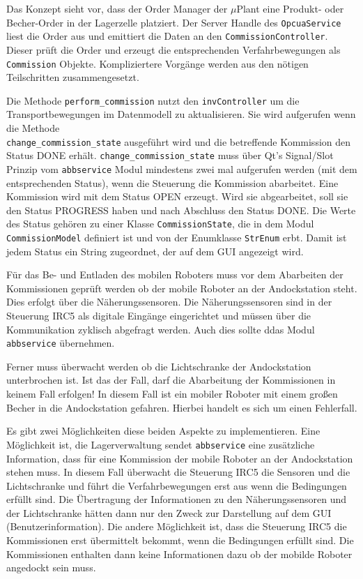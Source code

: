 Das Konzept sieht vor, dass der Order Manager der $\mu$Plant eine Produkt- oder Becher-Order in der Lagerzelle platziert.
Der Server Handle des \verb|OpcuaService| liest die Order aus und emittiert die Daten an den \verb|CommissionController|. 
Dieser prüft die Order und erzeugt die entsprechenden Verfahrbewegungen als \verb|Commission| Objekte. 
Kompliziertere Vorgänge werden aus den nötigen Teilschritten zusammengesetzt. 

Die Methode \verb|perform_commission| nutzt den \verb|invController| um die Transportbewegungen im Datenmodell zu aktualisieren.
Sie wird aufgerufen wenn die Methode \\ \verb|change_commission_state| ausgeführt wird und die betreffende Kommission den Status DONE erhält.
\verb|change_commission_state| muss über Qt's Signal/Slot Prinzip vom \verb|abbservice| Modul mindestens zwei mal aufgerufen werden (mit dem entsprechenden Status), wenn die Steuerung die Kommission abarbeitet.
Eine Kommission wird mit dem Status OPEN erzeugt. Wird sie abgearbeitet, soll sie den Status PROGRESS haben und nach Abschluss den Status DONE.
Die Werte des Status gehören zu einer Klasse \verb|CommissionState|, die in dem Modul \verb|CommissionModel| definiert ist und von der Enumklasse \verb|StrEnum| erbt.
Damit ist jedem Status ein String zugeordnet, der auf dem GUI angezeigt wird.

Für das Be- und Entladen des mobilen Roboters muss vor dem Abarbeiten der Kommissionen geprüft werden ob der mobile Roboter an der Andockstation steht.
Dies erfolgt über die Näherungssensoren. 
Die Näherungssensoren sind in der Steuerung IRC5 als digitale Eingänge eingerichtet und müssen über die Kommunikation zyklisch abgefragt werden. 
Auch dies sollte ddas Modul \verb|abbservice| übernehmen.

Ferner muss überwacht werden ob die Lichtschranke der Andockstation unterbrochen ist. Ist das der Fall, darf die Abarbeitung der Kommissionen in keinem Fall erfolgen!
In diesem Fall ist ein mobiler Roboter mit einem großen Becher in die Andockstation gefahren. Hierbei handelt es sich um einen Fehlerfall.

Es gibt zwei Möglichkeiten diese beiden Aspekte zu implementieren. Eine Möglichkeit ist, die Lagerverwaltung sendet \verb|abbservice| eine zusätzliche Information, dass für eine Kommission der mobile Roboter an der Andockstation stehen muss. 
In diesem Fall überwacht die Steuerung IRC5 die Sensoren und die Lichtschranke und führt die Verfahrbewegungen erst aus wenn die Bedingungen erfüllt sind.
Die Übertragung der Informationen zu den Näherungssensoren und der Lichtschranke hätten dann nur den Zweck zur Darstellung auf dem GUI (Benutzerinformation).
Die andere Möglichkeit ist, dass die Steuerung IRC5 die Kommissionen erst übermittelt bekommt, wenn die Bedingungen erfüllt sind. Die Kommissionen enthalten dann keine Informationen dazu ob der mobilde Roboter angedockt sein muss. 

